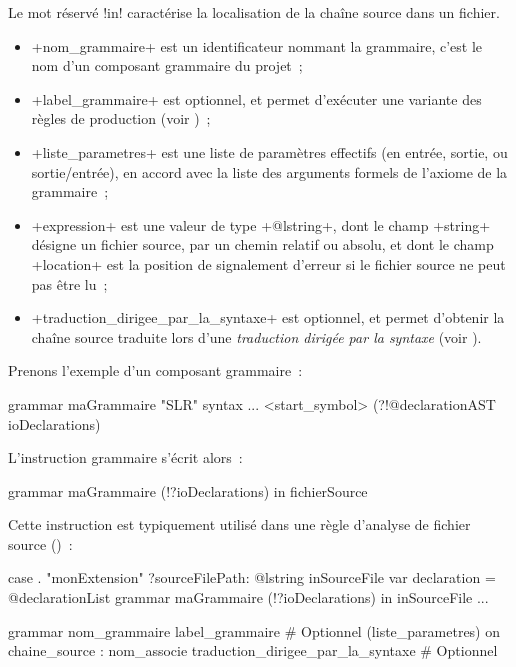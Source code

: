 Le mot réservé \ggs!in! caractérise la localisation de la chaîne source dans un fichier.
\begin{itemize}
  \item \ggs+nom_grammaire+ est un identificateur nommant la grammaire, c'est le nom d'un composant grammaire du projet~;
  \item \ggs+label_grammaire+ est optionnel, et permet d'exécuter une variante des règles de production (voir )~;
  \item \ggs+liste_parametres+ est une liste de paramètres effectifs (en entrée, sortie, ou sortie/entrée), en accord avec la liste des arguments formels de l'axiome de la grammaire~;
  \item \ggs+expression+ est une valeur de type \ggs+@lstring+, dont le champ \ggs+string+ désigne un fichier source, par un chemin relatif ou absolu, et dont le champ \ggs+location+ est la position de signalement d'erreur si le fichier source ne peut pas être lu~;
  \item \ggs+traduction_dirigee_par_la_syntaxe+ est optionnel, et permet d'obtenir la chaîne source traduite lors d'une \emph{traduction dirigée par la syntaxe} (voir ).
\end{itemize}

Prenons l'exemple d'un composant grammaire~:
\begin{galgas}
grammar maGrammaire "SLR" {
  syntax ...
   <start_symbol> (?!@declarationAST ioDeclarations)
}
\end{galgas}

L'instruction grammaire s'écrit alors~:
\begin{galgas}
grammar maGrammaire (!?ioDeclarations) in fichierSource
\end{galgas}

Cette instruction est typiquement utilisé dans une règle d'analyse de fichier source ()~:

\begin{galgas}
case . "monExtension"
?sourceFilePath: @lstring inSourceFile {
  var declaration = @declarationList {}
  grammar maGrammaire (!?ioDeclarations) in inSourceFile
  ...
}
\end{galgas}




\begin{galgasbox}
grammar
  nom_grammaire
  label_grammaire # Optionnel
  (liste_parametres)
  on chaine_source : nom_associe
  traduction_dirigee_par_la_syntaxe # Optionnel
\end{galgasbox}

